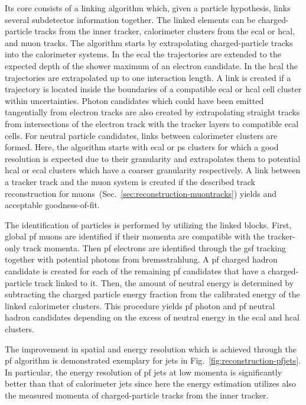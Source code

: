 Its core consists of a linking algorithm which, given a particle hypothesis, links several subdetector information together. The linked elements can be charged-particle tracks from the inner tracker, calorimeter clusters from the \gls{ecal} or \gls{hcal}, and muon tracks. The algorithm starts by extrapolating charged-particle tracks into the calorimeter systems. In the \gls{ecal} the trajectories are extended to the expected depth of the shower maximum of an electron candidate. In the \gls{hcal} the trajectories are extrapolated up to one interaction length. A link is created if a trajectory is located inside the boundaries of a compatible \gls{ecal} or \gls{hcal} cell cluster within uncertainties. Photon candidates which could have been emitted tangentially from electron tracks are also created by extrapolating straight tracks from intersections of the electron track with the tracker layers to compatible \gls{ecal} cells. For neutral particle candidates, links between calorimeter clusters are formed. Here, the algorithm starts with \gls{ecal} or \gls{ps} clusters for which a good resolution is expected due to their granularity and extrapolates them to potential \gls{hcal} or \gls{ecal} clusters which have a coarser granularity respectively. A link between a tracker track and the muon system is created if the described track reconstruction for muons~(Sec.~\ref{sec:reconstruction-muontracks}) yields and acceptable goodness-of-fit.

The identification of particles is performed by utilizing the linked blocks. First, global \gls{pf} muons are identified if their momenta are compatible with the tracker-only track momenta. Then \gls{pf} electrons are identified through the \gls{gsf} tracking together with potential photons from bremsstrahlung. A \gls{pf} charged hadron candidate is created for each of the remaining \gls{pf} candidates that have a charged-particle track linked to it. Then, the amount of neutral energy is determined by subtracting the charged particle energy fraction from the calibrated energy of the linked calorimeter clusters. This procedure yields \gls{pf} photon and \gls{pf} neutral hadron candidates depending on the excess of neutral energy in the \gls{ecal} and \gls{hcal} clusters.

The improvement in spatial and energy resolution which is achieved through the \gls{pf} algorithm is demonstrated exemplary for jets in Fig.~\ref{fig:reconstruction-pfjets}. In particular, the energy resolution of \gls{pf} jets at low momenta is significantly better than that of calorimeter jets since here the energy estimation utilizes also the measured momenta of charged-particle tracks from the inner tracker.

